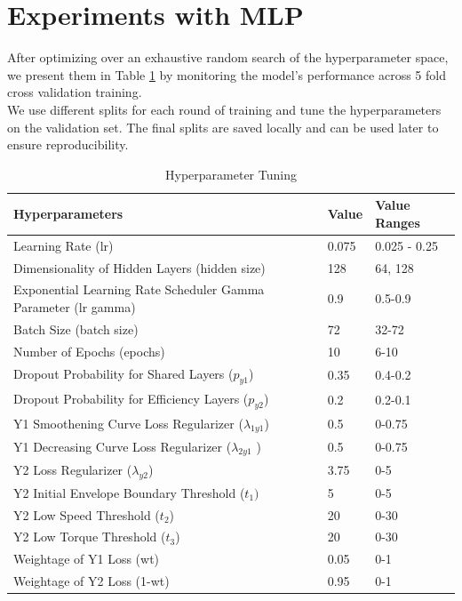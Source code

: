 \documentclass{report} %
\begin{document}
\section{Experiments with \ac{MLP}}\label{sec:Experiments with MLP}

After optimizing over an exhaustive random search of the hyperparameter space, we present them in Table \ref{tab:Hyperparameter Tunings} by monitoring the model's performance across 5 fold cross validation training.\\
We use different splits for each round of training and tune the hyperparameters on the validation set. The final splits are saved locally and can be used later to ensure reproducibility. 

\begin{table}[H]
    \centering
    \begin{tabularx}{\linewidth}{|p{}|p{}|p{}|}
    \hline {\bf Hyperparameters} & {\bf Value} & {\bf Value Ranges}\\
    \hline 
    Learning Rate (lr) & 0.075 & 0.025 - 0.25\\
    Dimensionality of Hidden Layers (hidden size)& 128 & 64, 128\\
    Exponential Learning Rate Scheduler Gamma Parameter (lr gamma)& 0.9 & 0.5-0.9\\
    Batch Size (batch size)& 72 & 32-72\\
    Number of Epochs (epochs)& 10 & 6-10\\
    Dropout Probability for Shared Layers ($p_{y1}$)& 0.35 & 0.4-0.2\\
    Dropout Probability for Efficiency Layers ($p_{y2}$) & 0.2 & 0.2-0.1\\
    Y1 Smoothening Curve Loss Regularizer ($\lambda_{1y1}$) & 0.5 & 0-0.75\\
    Y1 Decreasing Curve Loss Regularizer ($\lambda_{2y1}$ )& 0.5 & 0-0.75\\
    Y2 Loss Regularizer ($\lambda_{y2}$) & 3.75 & 0-5\\
    Y2 Initial Envelope Boundary Threshold ($t_{1})$& 5 & 0-5\\
    Y2 Low Speed Threshold ($t_{2}$)& 20 & 0-30\\
    Y2 Low Torque Threshold ($t_{3}$)& 20 & 0-30\\
    Weightage of Y1 Loss (wt)& 0.05 & 0-1\\
    Weightage of Y2 Loss (1-wt)& 0.95 & 0-1\\
    \hline
    \end{tabularx}
    \caption{Hyperparameter Tuning}
    \label{tab:Hyperparameter Tunings}
\end{table}
\end{document}
